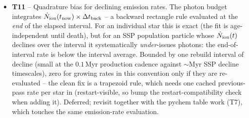 \begin{itemize}
  \item[$\square$] \textbf{T11} -- Quadrature bias for declining
    emission rates. The photon budget integrates
    $\dot N_{\rm ion}(t_{\rm now}) \times \Delta t_{\rm back}$ -- a
    backward rectangle rule evaluated at the \emph{end} of the elapsed
    interval. For an individual star this is exact (the fit is
    age-independent until death), but for an SSP population particle
    whose $\dot N_{\rm ion}(t)$ declines over the interval it
    systematically \emph{under}-issues photons: the end-of-interval
    rate is below the interval average. Bounded by one rebuild interval
    of decline (small at the $0.1\,$Myr production cadence against
    $\sim$Myr SSP decline timescales), zero for growing rates in this
    convention only if they are re-evaluated -- the clean fix is a
    trapezoid rule, which needs one cached previous-pass rate per star
    in  (restart-visible, so bump the
    restart-compatibility check when adding it). Deferred; revisit
    together with the pychem table work (T7), which touches the same
    emission-rate evaluation.
\end{itemize}
